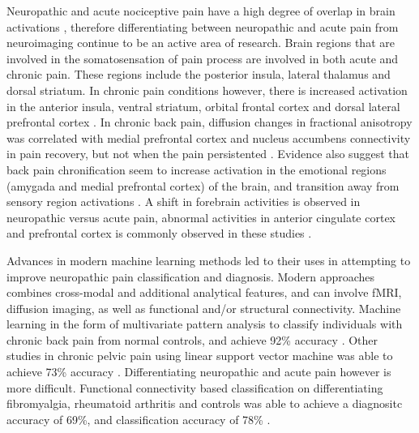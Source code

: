  Neuropathic and acute nociceptive pain have a high degree of overlap in brain activations \cite{Moisset2007}, therefore differentiating between neuropathic and acute pain from neuroimaging continue to be an active area of research. Brain regions that are involved in the somatosensation of pain process are involved in both acute and chronic pain. These regions include the posterior insula, lateral thalamus and dorsal striatum. In chronic pain conditions however, there is increased activation in the anterior insula, ventral striatum, orbital frontal cortex and dorsal lateral prefrontal cortex \cite{Lorenz2005}. In chronic back pain, diffusion changes in fractional anisotropy was correlated with medial prefrontal cortex and nucleus accumbens connectivity in pain recovery, but not when the pain persistented \cite{Mansour2013}. Evidence also suggest that back pain chronification seem to increase activation in the emotional regions (amygada and medial prefrontal cortex) of the brain, and transition away from sensory region activations \cite{Hashmi2013}. A shift in forebrain activities is observed in neuropathic versus acute pain, abnormal activities in anterior cingulate cortex and prefrontal cortex is commonly observed in these studies \cite{Davis2006}. 
 
 Advances in modern machine learning methods led to their uses in attempting to improve neuropathic pain classification and diagnosis. Modern approaches combines cross-modal and additional analytical features, and can involve fMRI, diffusion imaging, as well as functional and/or structural connectivity. Machine learning in the form of multivariate pattern analysis to classify individuals with chronic back pain from normal controls, and achieve 92\% accuracy \cite{Callan2014}. Other studies in chronic pelvic pain using linear support vector machine was able to achieve 73\% accuracy \cite{Bagarinao2014}. Differentiating neuropathic and acute pain however is more difficult. Functional connectivity based classification on differentiating fibromyalgia, rheumatoid arthritis and controls was able to achieve a diagnositc accuracy of 69\%, and classification accuracy of 78\% \cite{Sundermann2014}.    
 
 